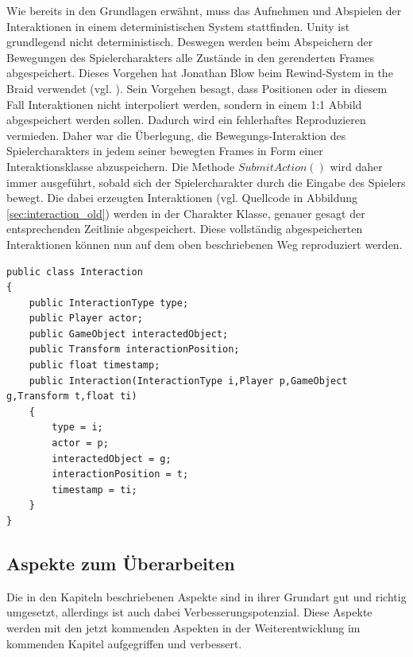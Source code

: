 Wie bereits in den Grundlagen erwähnt, muss das Aufnehmen und Abspielen der Interaktionen in einem deterministischen System stattfinden. Unity ist grundlegend nicht deterministisch. Deswegen werden beim Abspeichern der Bewegungen des Spielercharakters alle Zustände in den gerenderten Frames abgespeichert. Dieses Vorgehen hat Jonathan Blow beim Rewind-System in the Braid verwendet (vgl. \cite{gdc_implementation_2016}). Sein Vorgehen besagt, dass Positionen oder in diesem Fall Interaktionen nicht interpoliert werden, sondern in einem 1:1 Abbild abgespeichert werden sollen. Dadurch wird ein fehlerhaftes Reproduzieren vermieden. Daher war die Überlegung, die Bewegungs-Interaktion des Spielercharakters in jedem seiner bewegten Frames in Form einer Interaktionsklasse abzuspeichern. Die Methode $SubmitAction()$ wird daher immer ausgeführt, sobald sich der Spielercharakter durch die Eingabe des Spielers bewegt. Die dabei erzeugten Interaktionen (vgl. Quellcode in Abbildung \ref{sec:interaction_old}) werden in der Charakter Klasse, genauer gesagt der entsprechenden Zeitlinie abgespeichert. Diese vollständig abgespeicherten Interaktionen können nun auf dem oben beschriebenen Weg reproduziert werden.

\begin{lstlisting}[caption={Interaktionsklasse}, label={sec:interaction_old}]
public class Interaction
{
    public InteractionType type;
    public Player actor;
    public GameObject interactedObject;
    public Transform interactionPosition;
    public float timestamp;
    public Interaction(InteractionType i,Player p,GameObject g,Transform t,float ti)
    {
        type = i;
        actor = p;
        interactedObject = g;
        interactionPosition = t;
        timestamp = ti;
    }
}

\end{lstlisting}

\subsection{Aspekte zum Überarbeiten}
Die in den Kapiteln  beschriebenen Aspekte sind in ihrer Grundart gut und richtig umgesetzt, allerdings ist auch dabei Verbesserungspotenzial. Diese Aspekte werden mit den jetzt kommenden Aspekten in der Weiterentwicklung im kommenden Kapitel  aufgegriffen und verbessert.
